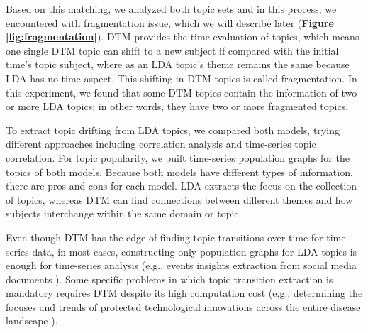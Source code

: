 Based on this matching, we analyzed both topic sets and in this process, we encountered with fragmentation issue, which we will describe later (\textbf{Figure \ref{fig:fragmentation}}).
DTM provides the time evaluation of topics, which means one single DTM topic can shift to a new subject if compared with the initial time's topic subject, where as an LDA topic's theme remains the same because LDA has no time aspect. This shifting in DTM topics is called fragmentation. In this experiment, we found that some DTM topics contain the information of two or more LDA topics; in other words, they have two or more fragmented topics.

To extract topic drifting from LDA topics, we compared both models, trying different approaches including correlation analysis and time-series topic correlation. For topic popularity, we built time-series population graphs for the topics of both models. Because both models have different types of information, there are pros and cons for each model. LDA extracts the focus on the collection of topics, whereas DTM can find connections between different themes and how subjects interchange within the same domain or topic.

Even though DTM has the edge of finding topic transitions over time for time-series data, in most cases, constructing only population graphs for LDA topics is enough for time-series analysis (e.g., events insights extraction from social media documents \cite{khan2019events}).
Some specific problems in which topic transition extraction is mandatory requires DTM despite its high computation cost (e.g., determining the focuses and trends of protected technological innovations across the entire disease landscape \cite{huang2019technological}).